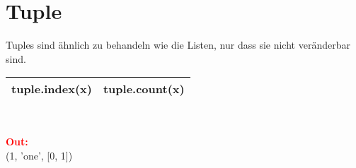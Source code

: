 \section*{Tuple}
Tuples sind ähnlich zu behandeln wie die Listen, nur dass sie nicht veränderbar sind.
\hspace{4cm}\\
\begin{tabular}[c]{|l|l|}
	\hline tuple.index(x) & tuple.count(x)
	\\\hline
\end{tabular}
\vspace{0.1cm}\\
\begin{minipage}[h]{10cm}
	
\end{minipage}
\begin{minipage}[h]{8cm}
	\textcolor{red}{\textbf{Out:}}
	\\(1, 'one', [0, 1])
\end{minipage}
\newpage